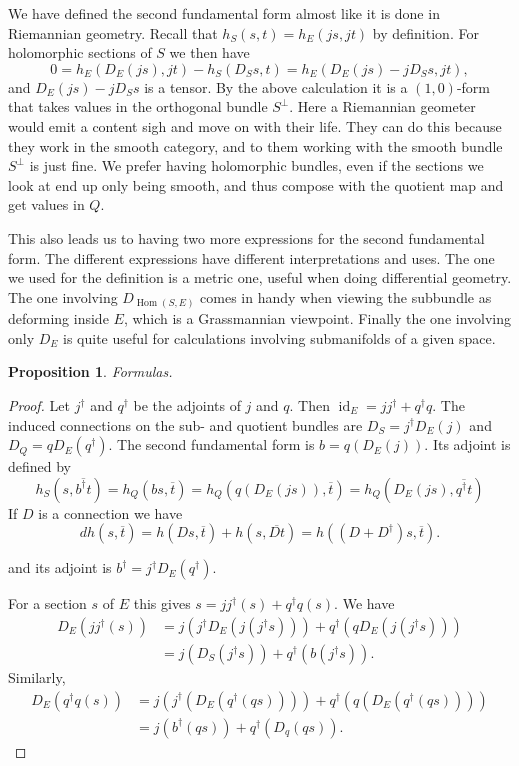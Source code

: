 \documentclass[10pt,a4paper]{article}
\newtheorem{prop}[theo]{Proposition}
\newtheorem*{proof}{Proof}
\def\ov#1{\overline{#1}}
\DeclareMathOperator{\Hom}{Hom}
\DeclareMathOperator{\id}{id}
\begin{document}
We have defined the second fundamental form almost like it is done in Riemannian geometry. Recall that $h_S(s,t) = h_E(js,jt)$ by definition. For holomorphic sections of $S$ we then have
\[
0
= h_E(D_E(js), jt) - h_S(D_Ss,t)
= h_E(D_E(js) - jD_Ss, jt),
\]
and $D_E(js) - jD_Ss$ is a tensor. By the above calculation it is a $(1,0)$-form that takes values in the orthogonal bundle $S^\perp$. Here a Riemannian geometer would emit a content sigh and move on with their life. They can do this because they work in the smooth category, and to them working with the smooth bundle $S^\perp$ is just fine. We prefer having holomorphic bundles, even if the sections we look at end up only being smooth, and thus compose with the quotient map and get values in $Q$.

This also leads us to having two more expressions for the second fundamental form. The different expressions have different interpretations and uses. The one we used for the definition is a metric one, useful when doing differential geometry. The one involving $D_{\Hom(S,E)}$ comes in handy when viewing the subbundle as deforming inside $E$, which is a Grassmannian viewpoint. Finally the one involving only $D_E$ is quite useful for calculations involving submanifolds of a given space.


\begin{prop}
Formulas.
\end{prop}

\begin{proof}
Let $j^\dagger$ and $q^\dagger$ be the adjoints of $j$ and $q$.
Then $\id_E = jj^\dagger + q^\dagger q$. The induced connections on the sub- and quotient bundles are $D_S = j^\dagger D_E(j)$ and $D_Q = q D_E(q^\dagger)$. The second fundamental form is $b = q(D_E(j))$. Its adjoint is defined by
\[
h_S(s, \ov{b^\dagger t})
= h_Q(bs, \ov t)
= h_Q(q(D_E(js)), \ov t)
= h_Q(D_E(js), \ov{q^\dagger t})
\]
If $D$ is a connection we have
\[
d h(s, \ov t)
= h(Ds, \ov t) + h(s, \ov{Dt})
= h((D + D^\dagger)s, \ov t).
\]


 and its adjoint is $b^\dagger = j^\dagger D_E(q^\dagger)$.

For a section $s$ of $E$ this gives $s = jj^\dagger(s) + q^\dagger q(s)$. We have
\begin{align*}
D_E(jj^\dagger(s))
&= j(j^\dagger D_E(j(j^\dagger s)))
+ q^\dagger(q D_E(j(j^\dagger s)))
\\
&= j(D_S(j^\dagger s))
+ q^\dagger(b(j^\dagger s)).
\end{align*}
Similarly,
\begin{align*}
D_E(q^\dagger q(s))
&= j(j^\dagger(D_E(q^\dagger(q s))))
+ q^\dagger(q(D_E(q^\dagger (q s))))
\\
&= j(b^\dagger(q s)) + q^\dagger (D_q(qs)).
\end{align*}
\end{proof}
\end{document}
